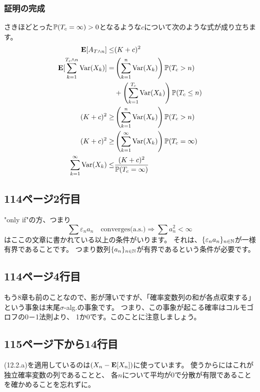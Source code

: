     \subsubsection{証明の完成}
      さきほどとった${\mathbb{P}}(T_c = \infty) > 0$となるような$c$について次のような式が成り立ちます。
      \begin{align*}
        {\mathbf{E}}[A_{T \wedge n}] \leq& (K + c)^2 \\
        {\mathbf{E}}[\sum_{k = 1}^{T_c \wedge n}{\text{Var}}(X_k)] =& \left( \sum_{k=1}^n {\text{Var}}(X_k)\right) {\mathbb{P}}(T_c > n)\\
        &+ \left( \sum_{k=1}^{T_c} {\text{Var}}(X_k)\right) {\mathbb{P}}(T_c \leq n)\\
        (K + c)^2 \ge& \left( \sum_{k=1}^n {\text{Var}}(X_k)\right) {\mathbb{P}}(T_c > n)\\
        (K + c)^2 \ge& \left( \sum_{k=1}^{\infty} {\text{Var}}(X_k)\right) {\mathbb{P}}(T_c = \infty)\\
        \sum_{k=1}^{\infty} {\text{Var}}(X_k) \leq& \frac{(K + c)^2}{{\mathbb{P}}(T_c = \infty)}
      \end{align*}

  \subsection{114ページ2行目}
    "only if"の方、つまり
    \[\sum \varepsilon_n a_n \quad \text{converges(a.s.)} \Rightarrow \sum a_n^2 < \infty\]
    はここの文章に書かれている以上の条件がいります。
    それは、$\{\varepsilon_n a_n\}_{n \in {\mathbb{N}}}$が一様有界であることです。
    つまり数列$\{a_n\}_{n \in {\mathbb{N}}}$が有界であるという条件が必要です。

  \subsection{114ページ4行目}
    もう8章も前のことなので、影が薄いですが、「確率変数列の和が各点収束する」
    という事象は末尾$\sigma$-alg.の事象です。
    つまり、この事象が起こる確率はコルモゴロフの0－1法則より、
    1か0です。このことに注意しましょう。

  \subsection{115ページ下から14行目}
    (12.2.a)を適用しているのは$(X_n - {\mathbf{E}}[X_n])$に使っています。
    使うからにはこれが独立確率変数の列であることと、
    各$n$について平均が0で分散が有限であることを確かめることを忘れずに。

